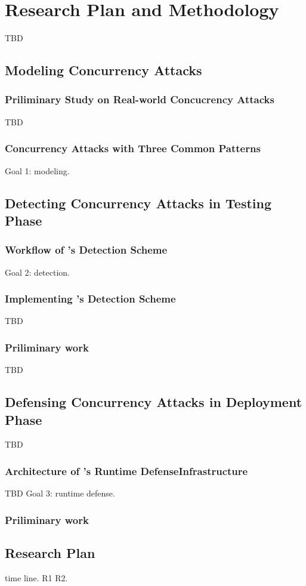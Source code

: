 \section{Research Plan and Methodology} \label{sec:rep}

TBD

\subsection{Modeling Concurrency Attacks} \label{sec:model}

\subsubsection{Priliminary Study on Real-world Concucrency Attacks} 
\label{sec:model-result}

TBD

\subsubsection{Concurrency Attacks with Three Common Patterns}
\label{sec:model-pattern}

Goal 1: modeling.

\subsection{Detecting Concurrency Attacks in Testing Phase}\label{sec:detect}

\subsubsection{Workflow of \xxx's Detection Scheme}\label{sec:detect-arch}

Goal 2: detection.

\subsubsection{Implementing \xxx's Detection Scheme}\label{sec:detect-impl}
TBD

\subsubsection{Priliminary work}\label{sec:detect-result}

TBD

\subsection{Defensing Concurrency Attacks in Deployment Phase} 
\label{sec:defense}

TBD

\subsubsection{Architecture of \xxx's Runtime DefenseInfrastructure} 
\label{sec:defense-arch}

TBD
Goal 3: runtime defense.

\subsubsection{Priliminary work} \label{sec:defense-result}


\subsection{Research Plan} \label{sec:rep}
time line. R1 R2.


